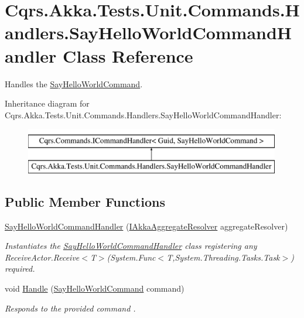 \hypertarget{classCqrs_1_1Akka_1_1Tests_1_1Unit_1_1Commands_1_1Handlers_1_1SayHelloWorldCommandHandler}{}\section{Cqrs.\+Akka.\+Tests.\+Unit.\+Commands.\+Handlers.\+Say\+Hello\+World\+Command\+Handler Class Reference}
\label{classCqrs_1_1Akka_1_1Tests_1_1Unit_1_1Commands_1_1Handlers_1_1SayHelloWorldCommandHandler}


Handles the \hyperlink{classCqrs_1_1Akka_1_1Tests_1_1Unit_1_1Commands_1_1SayHelloWorldCommand}{Say\+Hello\+World\+Command}.  


Inheritance diagram for Cqrs.\+Akka.\+Tests.\+Unit.\+Commands.\+Handlers.\+Say\+Hello\+World\+Command\+Handler\+:\begin{figure}[H]
\begin{center}
\leavevmode
\includegraphics[height=2.000000cm]{classCqrs_1_1Akka_1_1Tests_1_1Unit_1_1Commands_1_1Handlers_1_1SayHelloWorldCommandHandler}
\end{center}
\end{figure}
\subsection*{Public Member Functions}
\begin{DoxyCompactItemize}
\item 
\hyperlink{classCqrs_1_1Akka_1_1Tests_1_1Unit_1_1Commands_1_1Handlers_1_1SayHelloWorldCommandHandler_a421fd9e6d3c9cbb5e93453675af63de0_a421fd9e6d3c9cbb5e93453675af63de0}{Say\+Hello\+World\+Command\+Handler} (\hyperlink{interfaceCqrs_1_1Akka_1_1Domain_1_1IAkkaAggregateResolver}{I\+Akka\+Aggregate\+Resolver} aggregate\+Resolver)
\begin{DoxyCompactList}\small\item\em Instantiates the \hyperlink{classCqrs_1_1Akka_1_1Tests_1_1Unit_1_1Commands_1_1Handlers_1_1SayHelloWorldCommandHandler}{Say\+Hello\+World\+Command\+Handler} class registering any Receive\+Actor.\+Receive$<$\+T$>$(\+System.\+Func$<$\+T,\+System.\+Threading.\+Tasks.\+Task$>$) required. \end{DoxyCompactList}\item 
void \hyperlink{classCqrs_1_1Akka_1_1Tests_1_1Unit_1_1Commands_1_1Handlers_1_1SayHelloWorldCommandHandler_a204e1dacbacfb172a47d1585b76ef1f4_a204e1dacbacfb172a47d1585b76ef1f4}{Handle} (\hyperlink{classCqrs_1_1Akka_1_1Tests_1_1Unit_1_1Commands_1_1SayHelloWorldCommand}{Say\+Hello\+World\+Command} command)
\begin{DoxyCompactList}\small\item\em Responds to the provided {\itshape command} . \end{DoxyCompactList}\end{DoxyCompactItemize}
